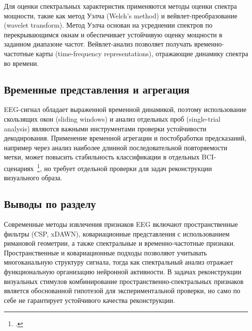 Для оценки спектральных характеристик применяются методы оценки спектра мощности, такие как метод Уэлча (Welch’s method) и вейвлет-преобразование (wavelet transform). Метод Уэлча основан на усреднении спектров по перекрывающимся окнам и обеспечивает устойчивую оценку мощности в заданном диапазоне частот. Вейвлет-анализ позволяет получать временно-частотные карты (time-frequency representations), отражающие динамику спектра во времени.

\subsection{Временные представления и агрегация}

EEG-сигнал обладает выраженной временной динамикой, поэтому использование скользящих окон (sliding windows) и анализ отдельных проб (single-trial analysis) являются важными инструментами проверки устойчивости декодирования. Применение временной агрегации и постобработки предсказаний, например через анализ наиболее длинной последовательной повторяемости метки, может повысить стабильность классификации в отдельных BCI-сценариях~\footcite{10.1109/jsen.2023.3270281}, но требует отдельной проверки для задач реконструкции визуального образа.

\subsection*{Выводы по разделу}

Современные методы извлечения признаков EEG включают пространственные фильтры (CSP, xDAWN), ковариационные представления с использованием римановой геометрии, а также спектральные и временно-частотные признаки. Пространственные и ковариационные подходы позволяют учитывать многоканальную структуру сигнала, тогда как спектральный анализ отражает функциональную организацию нейронной активности. В задачах реконструкции визуальных стимулов комбинирование пространственно-спектральных признаков является обоснованной гипотезой для экспериментальной проверки, но само по себе не гарантирует устойчивого качества реконструкции.
